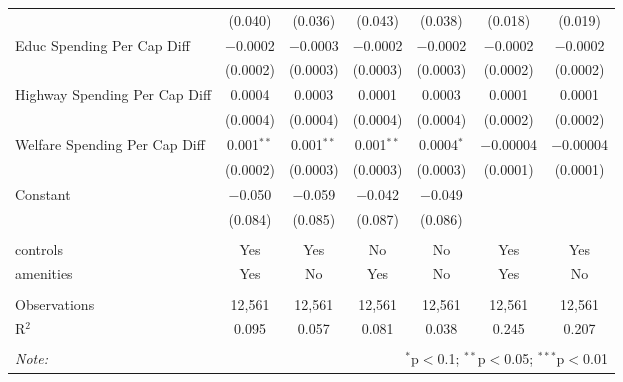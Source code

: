 \begin{table}[!htbp]
\begin{tabular}{@{\extracolsep{5pt}}lcccccc}
  & (0.040) & (0.036) & (0.043) & (0.038) & (0.018) & (0.019) \\ 
  Educ Spending Per Cap Diff & $-$0.0002 & $-$0.0003 & $-$0.0002 & $-$0.0002 & $-$0.0002 & $-$0.0002 \\ 
  & (0.0002) & (0.0003) & (0.0003) & (0.0003) & (0.0002) & (0.0002) \\ 
  Highway Spending Per Cap Diff & 0.0004 & 0.0003 & 0.0001 & 0.0003 & 0.0001 & 0.0001 \\ 
  & (0.0004) & (0.0004) & (0.0004) & (0.0004) & (0.0002) & (0.0002) \\ 
  Welfare Spending Per Cap Diff & 0.001$^{**}$ & 0.001$^{**}$ & 0.001$^{**}$ & 0.0004$^{*}$ & $-$0.00004 & $-$0.00004 \\ 
  & (0.0002) & (0.0003) & (0.0003) & (0.0003) & (0.0001) & (0.0001) \\ 
  Constant & $-$0.050 & $-$0.059 & $-$0.042 & $-$0.049 &  &  \\ 
  & (0.084) & (0.085) & (0.087) & (0.086) &  &  \\ 
 \hline \\[-1.8ex] 
controls & Yes & Yes & No & No & Yes & Yes \\ 
amenities & Yes & No & Yes & No & Yes & No \\ 
\hline \\[-1.8ex] 
Observations & 12,561 & 12,561 & 12,561 & 12,561 & 12,561 & 12,561 \\ 
R$^{2}$ & 0.095 & 0.057 & 0.081 & 0.038 & 0.245 & 0.207 \\ 
\hline 
\hline \\[-1.8ex] 
\textit{Note:}  & \multicolumn{6}{r}{$^{*}$p$<$0.1; $^{**}$p$<$0.05; $^{***}$p$<$0.01} \\ 
\end{tabular} 
\end{table} 
